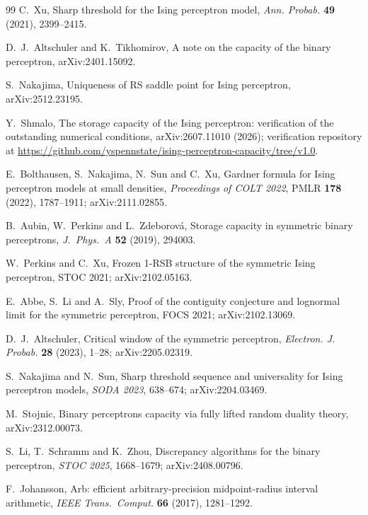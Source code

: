 \documentclass[11pt]{article}
\theoremstyle{remark}
\begin{document}
\begin{thebibliography}{99}
C.~Xu,
Sharp threshold for the Ising perceptron model,
\emph{Ann. Probab.} \textbf{49} (2021), 2399--2415.

D.~J.~Altschuler and K.~Tikhomirov,
A note on the capacity of the binary perceptron,
arXiv:2401.15092.

S.~Nakajima,
Uniqueness of RS saddle point for Ising perceptron,
arXiv:2512.23195.

Y.~Shmalo,
The storage capacity of the Ising perceptron: verification of the
outstanding numerical conditions,
arXiv:2607.11010 (2026); verification repository at
\url{https://github.com/yspennstate/ising-perceptron-capacity/tree/v1.0}.

E.~Bolthausen, S.~Nakajima, N.~Sun and C.~Xu,
Gardner formula for Ising perceptron models at small densities,
\emph{Proceedings of COLT 2022}, PMLR \textbf{178} (2022),
1787--1911; arXiv:2111.02855.

B.~Aubin, W.~Perkins and L.~Zdeborov\'a,
Storage capacity in symmetric binary perceptrons,
\emph{J.~Phys.~A} \textbf{52} (2019), 294003.

W.~Perkins and C.~Xu,
Frozen 1-RSB structure of the symmetric Ising perceptron,
STOC 2021; arXiv:2102.05163.

E.~Abbe, S.~Li and A.~Sly,
Proof of the contiguity conjecture and lognormal limit for the
symmetric perceptron,
FOCS 2021; arXiv:2102.13069.

D.~J.~Altschuler,
Critical window of the symmetric perceptron,
\emph{Electron. J. Probab.} \textbf{28} (2023), 1--28;
arXiv:2205.02319.

S.~Nakajima and N.~Sun,
Sharp threshold sequence and universality for Ising perceptron
models,
\emph{SODA 2023}, 638--674; arXiv:2204.03469.

M.~Stojnic,
Binary perceptrons capacity via fully lifted random duality theory,
arXiv:2312.00073.

S.~Li, T.~Schramm and K.~Zhou,
Discrepancy algorithms for the binary perceptron,
\emph{STOC 2025}, 1668--1679; arXiv:2408.00796.

F.~Johansson,
Arb: efficient arbitrary-precision midpoint-radius interval arithmetic,
\emph{IEEE Trans.~Comput.} \textbf{66} (2017), 1281--1292.


\end{thebibliography}
\end{document}
